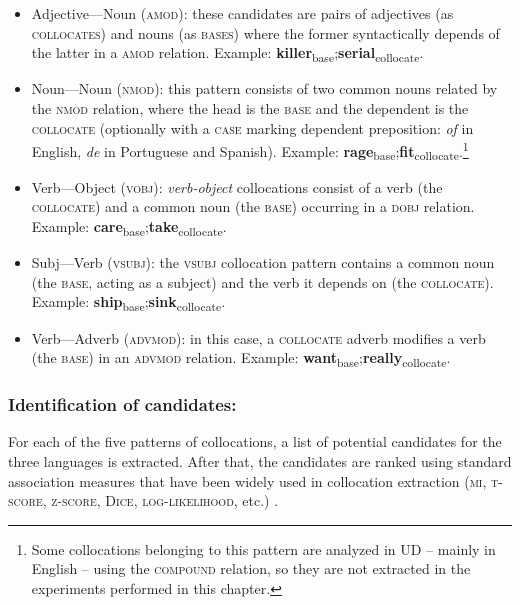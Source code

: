 \documentclass[output=paper
,modfonts
,nonflat]{langsci/langscibook}
\begin{document}
\begin{itemize}
\item Adjective---Noun (\textsc{amod}): these candidates are pairs of adjectives
(as \textsc{collocates}) and nouns (as \textsc{bases}) where the former syntactically depends
of the latter in a \textsc{amod} relation.
Example: \textbf{killer}\textsubscript{base};\textbf{serial}\textsubscript{collocate}.

\item Noun---Noun (\textsc{nmod}): this pattern consists of two common
nouns related by the \textsc{nmod} relation, where the head is the \textsc{base}
and the dependent is the \textsc{collocate} (optionally with a \textsc{case} marking
dependent preposition: \emph{of} in English, \emph{de} in Portuguese and Spanish).
Example: \textbf{rage}\textsubscript{base};\textbf{fit}\textsubscript{collocate}.\footnote{Some
  collocations belonging to this pattern are analyzed in UD -- mainly in English --
  using the \textsc{compound} relation, so they are not extracted in the experiments performed in this chapter.}

\item Verb---Object (\textsc{vobj}): \emph{verb-object} collocations consist
of a verb (the \textsc{collocate}) and a common noun (the \textsc{base})
occurring in a \textsc{dobj} relation.
Example: \textbf{care}\textsubscript{base};\textbf{take}\textsubscript{collocate}.

\item Subj---Verb (\textsc{vsubj}): the \textsc{vsubj} collocation pattern contains a
  common noun (the \textsc{base}, acting as a subject) and the verb it depends on
  (the \textsc{collocate}).
  Example: \textbf{ship}\textsubscript{base};\textbf{sink}\textsubscript{collocate}.
  
\item Verb---Adverb (\textsc{advmod}): in this case, a \textsc{collocate} adverb modifies
  a verb (the \textsc{base}) in an \textsc{advmod} relation.
  Example: \textbf{want}\textsubscript{base};\textbf{really}\textsubscript{collocate}.
\end{itemize}

\subsubsection{Identification of candidates:} For each of the five patterns of
collocations, a list of potential candidates for the three languages is extracted.
After that, the candidates are ranked using standard association measures that have
been widely used in collocation extraction (\textsc{mi, t-score, z-score, Dice, log-likelihood},
etc.) \citep{evert2008}.
\end{document}
